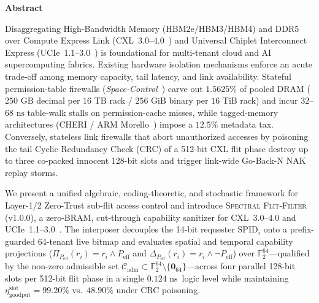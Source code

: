 \documentclass[10pt,twocolumn]{article}
\renewenvironment{abstract}{%
  \par\vspace{2pt}%
  \begin{center}%
  \begin{minipage}{0.95\textwidth}%
  \noindent{\color{black!55}\hrule height 0.4pt}\vspace{4pt}%
  \centerline{\bfseries\small Abstract}\vspace{3pt}%
  \fontsize{9.05}{11.15}\selectfont
  \setlength{\parskip}{0.38\baselineskip}%
  \setlength{\parindent}{0pt}%
}{%
  \par\vspace{4pt}\noindent{\color{black!55}\hrule height 0.4pt}%
  \end{minipage}%
  \end{center}%
  \vspace{3pt}%
}
\providecommand{\ReleaseVersion}{v1.0.0}
\providecommand{\StageOneNs}{\ensuremath{0.124\text{~ns}}}
\providecommand{\StageOneSieveDelayNs}{\StageOneNs}
\theoremstyle{spectralthm}
\begin{document}
\begin{abstract}
Disaggregating High-Bandwidth Memory (HBM2e/HBM3/HBM4) and DDR5 over Compute Express Link (\mbox{CXL~3.0--4.0}~\cite{cxl2025spec}) and Universal Chiplet Interconnect Express (\mbox{UCIe~1.1--3.0}~\cite{ucie2025spec30}) is foundational for multi-tenant cloud and AI supercomputing fabrics. Existing hardware isolation mechanisms enforce an acute trade-off among memory capacity, tail latency, and link availability. Stateful permission-table firewalls (\textit{Space-Control}~\cite{goswami2026spacecontrol}) carve out $1.5625\%$ of pooled DRAM ($250\text{~GB}$ decimal per $16\text{~TB}$ rack / $256\text{~GiB}$ binary per $16\text{~TiB}$ rack) and incur $32$--$68\text{~ns}$ table-walk stalls on permission-cache misses, while tagged-memory architectures (CHERI / ARM Morello~\cite{watson2015cheri}) impose a $12.5\%$ metadata tax. Conversely, stateless link firewalls that abort unauthorized accesses by poisoning the tail Cyclic Redundancy Check (CRC) of a 512-bit CXL flit phase destroy up to three co-packed innocent 128-bit slots and trigger link-wide Go-Back-N NAK replay storms.

We present a unified algebraic, coding-theoretic, and stochastic framework for Layer-1/2 Zero-Trust sub-flit access control and introduce \textsc{Spectral Flit-Filter} (\ReleaseVersion), a zero-BRAM, cut-through capability sanitizer for \mbox{CXL~3.0--4.0} and \mbox{UCIe~1.1--3.0}~\cite{cxl2025spec,ucie2025spec30}. The interposer decouples the 14-bit requester $\mathrm{SPID}_i$ onto a prefix-guarded 64-tenant live bitmap and evaluates spatial and temporal capability projections ($\Pi_{P_{\mathrm{eff}}}(r_i) = r_i \wedge P_{\mathrm{eff}}$ and $\Delta_{P_{\mathrm{eff}}}(r_i) = r_i \wedge \neg P_{\mathrm{eff}}$) over $\mathbb{F}_2^{64}$---qualified by the non-zero admissible set $\mathcal{C}_{\mathrm{adm}} \subset \mathbb{F}_2^{64} \setminus \{\mathbf{0}_{64}\}$---across four parallel 128-bit slots per 512-bit flit phase in a single \StageOneSieveDelayNs\ logic level while maintaining $\eta_{\mathrm{goodput}}^{\mathrm{slot}} = 99.20\%$ vs.\ $48.90\%$ under CRC poisoning.


\end{abstract}
\end{document}
